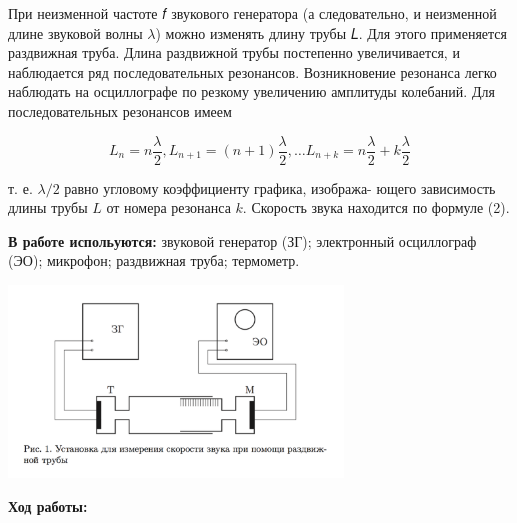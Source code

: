 \documentclass[10pt]{article}
\begin{document}
    При неизменной частоте 𝑓 звукового генератора (а следовательно, и неизменной длине звуковой волны $\lambda$) можно изменять длину трубы 𝐿. Для этого применяется раздвижная труба. Длина раздвижной трубы постепенно увеличивается, и наблюдается ряд последовательных резонансов. Возникновение резонанса легко наблюдать на осциллографе по резкому увеличению амплитуды колебаний. Для последовательных резонансов имеем

    \begin{equation}
        L_n = n\frac{\lambda}{2}, L_{n+1} = (n+1)\frac{\lambda}{2}, \dots L_{n+k} = n\frac{\lambda}{2} + k\frac{\lambda}{2}
    \end{equation}
    
    т. е. $\lambda/2$ равно угловому коэффициенту графика, изобража- ющего зависимость длины трубы $L$ от номера резонанса $k$. Скорость звука находится по формуле (2).

    \textbf{В работе испольуются:} звуковой генератор (ЗГ); электронный осциллограф (ЭО); микрофон; раздвижная труба; термометр.

    \begin{center} 
    \includegraphics[width=3.5in]{stand.png}
    \end{center}

    \textbf{Ход работы:}
\end{document}
